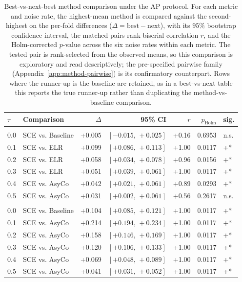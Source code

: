 \begin{table}[h!]
\centering
\caption{Best-vs-next-best method comparison under the AP protocol. For each metric and noise rate, the highest-mean method is compared against the second-highest on the per-fold differences ($\Delta = \text{best} - \text{next}$), with its $95\%$ bootstrap confidence interval, the matched-pairs rank-biserial correlation $r$, and the Holm-corrected $p$-value across the six noise rates within each metric. The tested pair is rank-selected from the observed means, so this comparison is exploratory and read descriptively; the pre-specified pairwise family (Appendix~\ref{app:method-pairwise}) is its confirmatory counterpart. Rows where the runner-up is the baseline are retained, as in a best-vs-next table this reports the true runner-up rather than duplicating the method-vs-baseline comparison.}
\label{tab:method-between}
\begin{tabular}{llrrrrl}
\toprule
$\tau$ & Comparison & $\Delta$ & 95\% CI & $r$ & $p_{\mathrm{Holm}}$ & sig. \\
\midrule
\addlinespace
\multicolumn{7}{l}{\textit{Balanced accuracy}} \\
0.0 & SCE vs. Baseline & +0.005 & $[-0.015,\,+0.025]$ & +0.16 & 0.6953 & n.s. \\
0.1 & SCE vs. ELR & +0.099 & $[+0.086,\,+0.113]$ & +1.00 & 0.0117 & +* \\
0.2 & SCE vs. ELR & +0.058 & $[+0.034,\,+0.078]$ & +0.96 & 0.0156 & +* \\
0.3 & SCE vs. ELR & +0.051 & $[+0.039,\,+0.061]$ & +1.00 & 0.0117 & +* \\
0.4 & SCE vs. AsyCo & +0.042 & $[+0.021,\,+0.061]$ & +0.89 & 0.0293 & +* \\
0.5 & SCE vs. AsyCo & +0.031 & $[+0.002,\,+0.061]$ & +0.56 & 0.2617 & n.s. \\
\addlinespace
\multicolumn{7}{l}{\textit{Macro F1}} \\
0.0 & SCE vs. Baseline & +0.104 & $[+0.085,\,+0.121]$ & +1.00 & 0.0117 & +* \\
0.1 & SCE vs. AsyCo & +0.214 & $[+0.194,\,+0.234]$ & +1.00 & 0.0117 & +* \\
0.2 & SCE vs. AsyCo & +0.158 & $[+0.146,\,+0.169]$ & +1.00 & 0.0117 & +* \\
0.3 & SCE vs. AsyCo & +0.120 & $[+0.106,\,+0.133]$ & +1.00 & 0.0117 & +* \\
0.4 & SCE vs. AsyCo & +0.069 & $[+0.048,\,+0.089]$ & +1.00 & 0.0117 & +* \\
0.5 & SCE vs. AsyCo & +0.041 & $[+0.031,\,+0.052]$ & +1.00 & 0.0117 & +* \\

\end{tabular}
\end{table}
